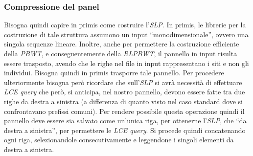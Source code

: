 \subsubsection{Compressione del panel}
Bisogna quindi capire in primis come costruire l'\textit{SLP}. In primis, le
librerie per la costruzione di tale struttura assumono un input
``monodimensionale'', ovvero una singola sequenze lineare. Inoltre, anche per
permettere la costruzione efficiente della \textit{PBWT}, e conseguentemente
della \textit{RLPBWT}, il pannello in input risulta essere trasposto, avendo che
le righe nel file in input rappresentano i siti e non gli individui. Bisogna
quindi in primis trasporre tale pannello. Per procedere ulteriormente bisogna
però ricordare che sull'\textit{SLP} si avrà 
necessità di effettuare \textit{LCE query} che però, si anticipa, nel nostro
pannello, devono essere fatte tra due righe da destra a sinistra (a differenza
di quanto visto nel caso standard dove si confrontavano prefissi comuni). Per
rendere possibile questa operazione quindi il pannello deve essere sia 
salvato come un'unica riga, per ottenerne l'\textit{SLP}, che ``da destra a
sinistra'', per permettere le \textit{LCE query}. Si procede quindi concatenando
ogni riga, selezionandole consecutivamente e leggendone i singoli elementi da
destra a sinistra.
